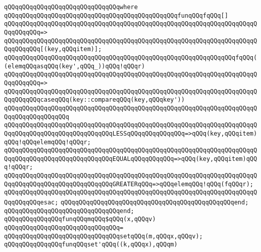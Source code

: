 \verb|qQQqqQQqqQQqqQQqqQQqqQQqqQQqqQQqwhere|\newline
\verb|qQQqqQQqqQQqqQQqqQQqqQQqqQQqqQQqqQQqqQQqqQQqqQQqfunqQQqfqQQq[]|\newline
\verb|qQQqqQQqqQQqqQQqqQQqqQQqqQQqqQQqqQQqqQQqqQQqqQQqqQQqqQQqqQQqqQQqqQQqqQQqqQQqqQQq=>|\newline
\verb|qQQqqQQqqQQqqQQqqQQqqQQqqQQqqQQqqQQqqQQqqQQqqQQqqQQqqQQqqQQqqQQqqQQqqQQqqQQqqQQq[(key,qQQqitem)];|\newline
\newline
\verb|qQQqqQQqqQQqqQQqqQQqqQQqqQQqqQQqqQQqqQQqqQQqqQQqqQQqqQQqqQQqqQQqfqQQq((elemqQQqasqQQq(key',qQQq_))qQQq!qQQqr)|\newline
\verb|qQQqqQQqqQQqqQQqqQQqqQQqqQQqqQQqqQQqqQQqqQQqqQQqqQQqqQQqqQQqqQQqqQQqqQQqqQQqqQQq=>|\newline
\verb|qQQqqQQqqQQqqQQqqQQqqQQqqQQqqQQqqQQqqQQqqQQqqQQqqQQqqQQqqQQqqQQqqQQqqQQqqQQqqQQqcaseqQQq(key::compareqQQq(key,qQQqkey'))|\newline
\verb|qQQqqQQqqQQqqQQqqQQqqQQqqQQqqQQqqQQqqQQqqQQqqQQqqQQqqQQqqQQqqQQqqQQqqQQqqQQqqQQqqQQqqQQq|\newline
\verb|qQQqqQQqqQQqqQQqqQQqqQQqqQQqqQQqqQQqqQQqqQQqqQQqqQQqqQQqqQQqqQQqqQQqqQQqqQQqqQQqqQQqqQQqqQQqqQQqqQQqLESSqQQqqQQqqQQqqQQq=>qQQq(key,qQQqitem)qQQq!qQQqelemqQQq!qQQqr;|\newline
\verb|qQQqqQQqqQQqqQQqqQQqqQQqqQQqqQQqqQQqqQQqqQQqqQQqqQQqqQQqqQQqqQQqqQQqqQQqqQQqqQQqqQQqqQQqqQQqqQQqqQQqEQUALqQQqqQQqqQQq=>qQQq(key,qQQqitem)qQQq!qQQqr;|\newline
\verb|qQQqqQQqqQQqqQQqqQQqqQQqqQQqqQQqqQQqqQQqqQQqqQQqqQQqqQQqqQQqqQQqqQQqqQQqqQQqqQQqqQQqqQQqqQQqqQQqqQQqGREATERqQQq=>qQQqelemqQQq!qQQq(fqQQqr);|\newline
\verb|qQQqqQQqqQQqqQQqqQQqqQQqqQQqqQQqqQQqqQQqqQQqqQQqqQQqqQQqqQQqqQQqqQQqqQQqqQQqqQQqesac;|\newline
\verb|qQQqqQQqqQQqqQQqqQQqqQQqqQQqqQQqqQQqqQQqqQQqqQQqend;|\newline
\verb|qQQqqQQqqQQqqQQqqQQqqQQqqQQqqQQqend;|\newline
\newline
\verb|qQQqqQQqqQQqqQQqfunqQQqmqQQq$qQQq(x,qQQqv)|\newline
\verb|qQQqqQQqqQQqqQQqqQQqqQQqqQQqqQQq=|\newline
\verb|qQQqqQQqqQQqqQQqqQQqqQQqqQQqqQQqsetqQQq(m,qQQqx,qQQqv);|\newline
\newline
\verb|qQQqqQQqqQQqqQQqfunqQQqset'qQQq((k,qQQqx),qQQqm)|\newline
